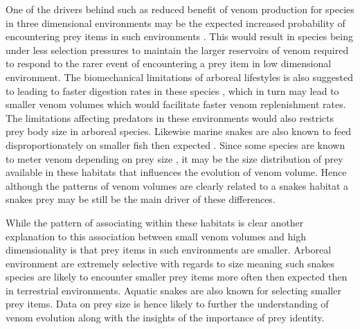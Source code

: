 One of the drivers behind such as reduced benefit of venom production for species in three dimensional environments may be the expected increased probability of encountering prey items in such environments \citep{pawar2012dimensionality}. This would result in species being under less selection pressures to maintain the larger reservoirs of venom required to respond to the rarer event of encountering a prey item in low dimensional environment. The biomechanical limitations of arboreal lifestyles is also suggested to leading to faster digestion rates in these species \citep{lillywhite2002patterns}, which in turn may lead to smaller venom volumes which would facilitate faster venom replenishment rates. The limitations affecting predators in these environments would also restricts prey body size in arboreal species. Likewise marine snakes are also known to feed disproportionately on smaller fish then expected \citep{voris1981size}. Since some species are known to meter venom depending on prey size \citep{hayes1995venom}, it may be the size distribution of prey available in these habitats that influences the evolution of venom volume. Hence although the patterns of venom volumes are clearly related to a snakes habitat a snakes prey may be still be the main driver of these differences. %


 While the pattern of associating within these habitats is clear another explanation to this association between small venom volumes and high dimensionality is that prey items in such environments are smaller. Arboreal environment are extremely selective with regards to size meaning such snakes species are likely to encounter smaller prey items more often then expected then in terrestrial environments. Aquatic snakes are also known for selecting smaller prey items. Data on prey size is hence likely to further the understanding of venom evolution along with the insights of the importance of prey identity.



